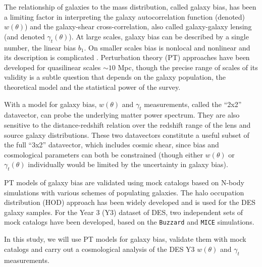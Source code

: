 \documentclass[fleqn,usenatbib]{mnras}
\newcommand{\mice}{\texttt{MICE} }
\newcommand{\buzzard}{\texttt{Buzzard} }
\begin{document}
The relationship of galaxies to the mass distribution, called galaxy bias, has been a limiting factor in interpreting the galaxy autocorrelation function (denoted) $w(\theta)$) and the galaxy-shear cross-correlation, also called galaxy-galaxy lensing (and denoted $\gamma_t(\theta)$). At large scales, galaxy bias can be described by a single number, the linear bias $b_1$. On smaller scales bias is nonlocal and nonlinear and its description is complicated \citep{Fry_93,Scherrer_98}. Perturbation theory (PT) approaches have been developed for quasilinear scales $\sim 10$ Mpc, though the precise range of scales of its validity is a subtle question that depends on the galaxy population, the theoretical model and the statistical power of the survey. 

With a model for galaxy bias, $w(\theta)$ and $\gamma_t$ measurements, called the ``2x2'' datavector,   can probe the underlying matter power spectrum. They are also sensitive to the distance-redshift relation over the redshift range of the lens and source galaxy distributions.  These two datavectors constitute a useful subset of the full ``3x2'' datavector, which includes cosmic shear, since bias and cosmological parameters can both be constrained (though either $w(\theta)$ or $\gamma_t(\theta)$ individually would be limited by the uncertainty in galaxy bias). 

PT models of galaxy bias are validated using mock catalogs based on N-body simulations with various schemes of populating galaxies. The halo occupation distribution (HOD) approach has been widely developed and is used for the DES galaxy samples. For the Year 3 (Y3) dataset of DES, two independent sets of mock catalogs have been developed, based on the \buzzard and \mice simulations. 

In this study, we will use PT models for galaxy bias, validate them with mock catalogs and carry out a cosmological analysis of the DES Y3 $w(\theta)$ and $\gamma_t$ measurements.
\end{document}
